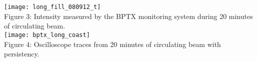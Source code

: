 \documentclass[portrait,final]{baposter}
\begin{document}
\begin{poster}
{\begin{multicols}{2}
\begin{center}
    \texttt{[image: long\_fill\_080912\_t]}\\
    \smaller Figure 3: Intensity measured by the BPTX monitoring system during 20 minutes of circulating beam. \\
    \texttt{[image: bptx\_long\_coast]}\\
    Figure 4: Oscilloscope traces from 20 minutes of circulating beam with persistency.\\
\end{center}

\end{multicols}






}


\end{poster}
\end{document}
